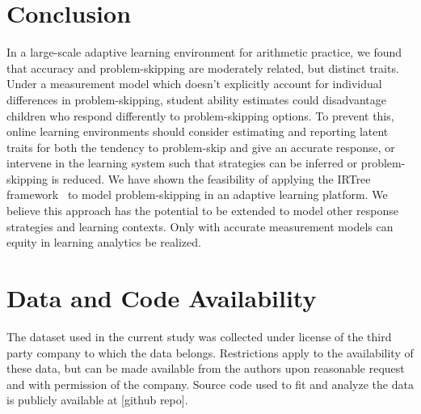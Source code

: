 \documentclass[11pt]{article}
\begin{document}
\section{Conclusion}
In a large-scale adaptive learning environment for arithmetic practice, we found that accuracy and problem-skipping are moderately related, but distinct traits. Under a measurement model which doesn't explicitly account for individual differences in problem-skipping, student ability estimates could disadvantage children who respond differently to problem-skipping options. To prevent this, online learning environments should consider estimating and reporting latent traits for both the tendency to problem-skip and give an accurate response, or intervene in the learning system such that strategies can be inferred or problem-skipping is reduced. We have shown the feasibility of applying the IRTree framework~\parencite{de2012irtrees} to model problem-skipping in an adaptive learning platform. We believe this approach has the potential to be extended to model other response strategies and learning contexts. Only with accurate measurement models can equity in learning analytics be realized. 

\section{Data and Code Availability}
The dataset used in the current study was collected under license of the third party company to which the data belongs. Restrictions apply to the availability of these data, but can be made available from the authors upon reasonable request and with permission of the company. Source code used to fit and analyze the data is publicly available at [github repo].

%
% 
\printbibliography
\end{document}
